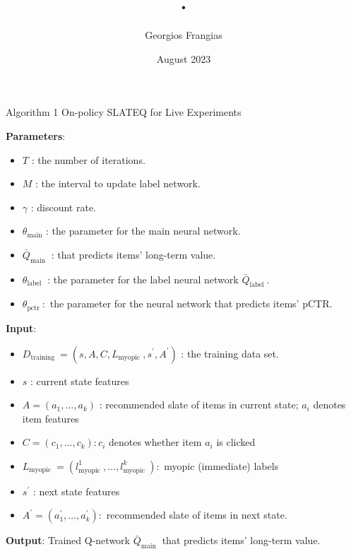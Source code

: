 \documentclass{article}
\title{.}
\author{Georgios Frangias}
\date{August 2023}
\begin{document}
\maketitle

Algorithm 1 On-policy SLATEQ for Live Experiments\\
\footnotesize
\begin{algorithmic}[1]
    \State \textbf{Parameters}:
    \begin{itemize}
        \item $T$ : the number of iterations.
        \item $M$ : the interval to update label network.
        \item $\gamma$ : discount rate.
        \item $\theta_{\operatorname{main}}$ : the parameter for the main neural network.
        \item $\bar{Q}_{\text {main }}$ : that predicts items' long-term value.
        \item $\theta_{\text {label }}$ : the parameter for the label neural network $\bar{Q}_{\text {label }}$.
        \item $\theta_{\text {pctr }}:$ the parameter for the neural network that predicts items' pCTR.
    \end{itemize}

    \State \textbf{Input}: 
    \begin{itemize}
        \item $D_{\text {training }}=\left(s, A, C, L_{\text {myopic }}, s^{\prime}, A^{\prime}\right)$ : the training data set.
        \item $s$ : current state features
        \item $A=\left(a_1, \ldots, a_k\right)$ : recommended slate of items in current state; $a_i$ denotes item features
        \item $C=\left(c_1, \ldots, c_k\right): c_i$ denotes whether item $a_i$ is clicked
        \item $L_{\text {myopic }}=\left(l_{\text {myopic }}^1, \ldots, l_{\text {myopic }}^k\right):$ myopic (immediate) labels
        \item $s^{\prime}$ : next state features
        \item $A^{\prime}=\left(a_1^{\prime}, \ldots, a_k^{\prime}\right):$ recommended slate of items in next state.
    \end{itemize}

    \State \textbf{Output}: Trained Q-network $\bar{Q}_{\text {main }}$ that predicts items' long-term value. 


\end{algorithmic}
\end{document}

